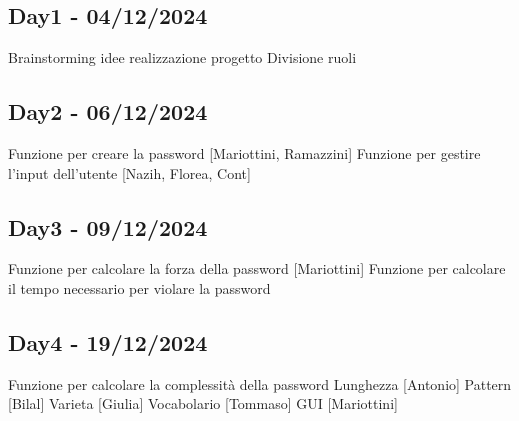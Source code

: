 \documentclass{scrartcl}
\begin{document}
        \subsection{Day1 - 04/12/2024}
            \begin{outline}
                \1 Brainstorming idee realizzazione progetto
                \1 Divisione ruoli
            \end{outline}
        
        \subsection{Day2 - 06/12/2024}
            \begin{outline}
                \1 Funzione per creare la password [Mariottini, Ramazzini]
                \1 Funzione per gestire l'input dell'utente [Nazih, Florea, Cont]
            \end{outline}
            
        \subsection{Day3 - 09/12/2024}
            \begin{outline}
                \1 Funzione per calcolare la forza della password [Mariottini]
                \1 Funzione per calcolare il tempo necessario per violare la password
            \end{outline}
        
        \subsection{Day4 - 19/12/2024}
        \begin{outline}
            \1 Funzione per calcolare la complessità della password
                \2 Lunghezza [Antonio]
                \2 Pattern [Bilal]
                \2 Varieta [Giulia]
                \2 Vocabolario [Tommaso]
            \1 GUI [Mariottini]
        \end{outline}
\end{document}
